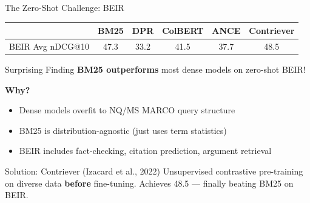 \documentclass[aspectratio=169]{beamer}
\newif\ifanimated
\newcommand{\cpause}{\ifanimated\pause\fi}
\begin{document}
\begin{frame}{The Zero-Shot Challenge: BEIR}
\begin{center}
\begin{tabular}{lccccc}
\toprule
& \textbf{BM25} & \textbf{DPR} & \textbf{ColBERT} & \textbf{ANCE} & \textbf{Contriever} \\
\midrule
BEIR Avg nDCG@10 & 47.3 & 33.2 & 41.5 & 37.7 & 48.5 \\
\bottomrule
\end{tabular}
\end{center}

\cpause
\vspace{0.5em}

\begin{alertblock}{Surprising Finding}
\textbf{BM25 outperforms} most dense models on zero-shot BEIR!
\end{alertblock}

\textbf{Why?}
\begin{itemize}
    \item Dense models overfit to NQ/MS MARCO query structure
    \item BM25 is distribution-agnostic (just uses term statistics)
    \item BEIR includes fact-checking, citation prediction, argument retrieval
\end{itemize}

\cpause
\vspace{0.5em}

\begin{exampleblock}{Solution: Contriever (Izacard et al., 2022)}
Unsupervised contrastive pre-training on diverse data \textbf{before} fine-tuning. Achieves 48.5 --- finally beating BM25 on BEIR.
\end{exampleblock}
\end{frame}
\end{document}
